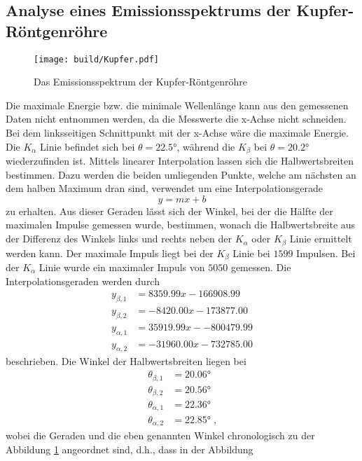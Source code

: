 \subsection{Analyse eines Emissionsspektrums der Kupfer-Röntgenröhre} \label{sec:kupferlinien}
\begin{figure}
    \centering
    \caption{Das Emissionsspektrum der Kupfer-Röntgenröhre}
    \label{fig:Kupfer}
    \texttt{[image: build/Kupfer.pdf]}
\end{figure}
Die maximale Energie bzw. die minimale Wellenlänge kann aus den gemessenen Daten nicht entnommen werden, da die Messwerte die x-Achse nicht schneiden.
Bei dem linksseitigen Schnittpunkt mit der x-Achse wäre die maximale Energie. \\
Die $K_\alpha$ Linie befindet sich bei $\theta = \ang{22.5;;}$, während die $K_\beta$ bei  $\theta = \ang{20.2;;}$ wiederzufinden ist.
Mittels linearer Interpolation lassen sich die Halbwertsbreiten bestimmen.
Dazu werden die beiden umliegenden Punkte, welche am nächsten an dem halben Maximum dran sind, verwendet um eine Interpolationsgerade
\begin{equation*}
    y = mx+b 
\end{equation*}
zu erhalten.
Aus dieser Geraden lässt sich der Winkel, bei der die Hälfte der maximalen Impulse gemessen wurde, bestimmen, wonach die Halbwertsbreite
aus der Differenz des Winkels links und rechts neben der $K_\alpha$ oder $K_\beta$ Linie ermittelt werden kann.
Der maximale Impuls liegt bei der $K_\beta$ Linie bei $1599$ Impulsen. 
Bei der $K_\alpha$ Linie wurde ein maximaler Impuls von $5050$ gemessen.
Die Interpolationsgeraden werden durch 
\begin{align*}
    y_{\beta, 1} &= 8359.99x - 166908.99    \\
    y_{\beta, 2} &= -8420.00x - 173877.00   \\
    y_{\alpha, 1} &= 35919.99x - -800479.99  \\
    y_{\alpha, 2} &= -31960.00x - 732785.00
\end{align*}
beschrieben.
Die Winkel der Halbwertsbreiten liegen bei 
\begin{align*}
    \theta_{\beta, 1} &= \ang{20.06;;}\\
    \theta_{\beta, 2} &= \ang{20.56;;}\\
    \theta_{\alpha, 1} &= \ang{22.36;;}\\
    \theta_{\alpha, 2} &= \ang{22.85;;} \; \text{,}
\end{align*}
wobei die Geraden und die eben genannten Winkel chronologisch zu der Abbildung \ref{fig:Kupfer} angeordnet  sind, d.h., dass in der Abbildung 
